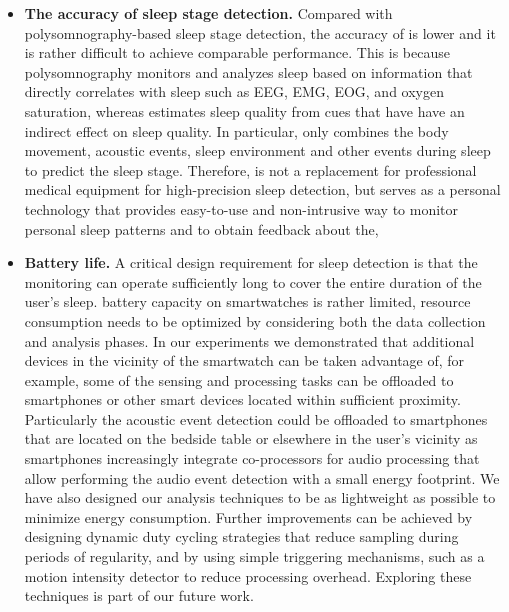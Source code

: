 \begin{itemize}
  \item \textbf{The accuracy of sleep stage detection.}
  Compared with polysomnography-based sleep stage detection, the accuracy of {\systemname} is lower and it is rather difficult to achieve comparable performance. This is because polysomnography monitors and analyzes sleep based on information that directly correlates with sleep such as EEG, EMG, EOG, and oxygen saturation, whereas {\systemname} estimates sleep quality from cues that have have an indirect effect on sleep quality. In particular, \systemname only combines the body movement, acoustic events, sleep environment and other events during sleep to predict the sleep stage. Therefore, {\systemname} is not a replacement for professional medical equipment for high-precision sleep detection, but serves as a personal technology that provides easy-to-use and non-intrusive way to monitor personal sleep patterns and to obtain feedback about the, %
  \item \textbf{Battery life.} 
  A critical design requirement for sleep detection is that the monitoring can operate sufficiently long to cover the entire duration of the user's sleep. battery capacity on smartwatches is rather limited, resource consumption needs to be optimized by considering both the data collection and analysis phases. In our experiments we demonstrated that additional devices in the vicinity of the smartwatch can be taken advantage of, for example, some of the sensing and processing tasks can be offloaded to smartphones or other smart devices located within sufficient proximity. Particularly the acoustic event detection could be offloaded to smartphones that are located on the bedside table or elsewhere in the user's vicinity as smartphones increasingly integrate co-processors for audio processing that allow performing the audio event detection with a small energy footprint. We have also designed our analysis techniques to be as lightweight as possible to minimize energy consumption. Further improvements can be achieved by designing dynamic duty cycling strategies that reduce sampling during periods of regularity, and by using simple triggering mechanisms, such as a motion intensity detector to reduce processing overhead. Exploring these techniques is part of our future work.%

\end{itemize}
